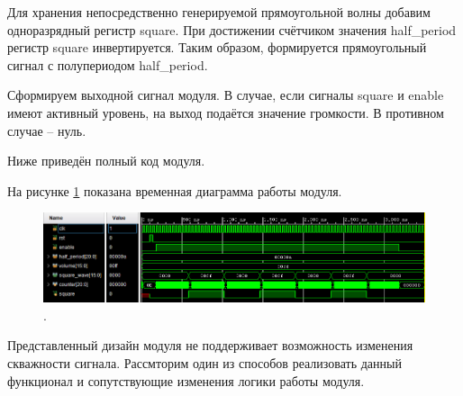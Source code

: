 \noindent
\begin{minipage}{\linewidth}
	
\end{minipage}

Для хранения непосредственно генерируемой прямоугольной волны добавим одноразрядный регистр square.
При достижении счётчиком значения half\_period регистр square инвертируется. Таким образом, формируется прямоугольный сигнал с полупериодом half\_period.

\noindent
\begin{minipage}{\linewidth}
	
\end{minipage}

Сформируем выходной сигнал модуля. В случае, если сигналы square и enable имеют активный уровень, на выход подаётся значение громкости. В противном случае -- нуль.

\noindent
\begin{minipage}{\linewidth}
	
\end{minipage}

Ниже приведён полный код модуля.

\noindent
\begin{minipage}{\linewidth}
	
\end{minipage}


На рисунке \ref{lab7:pic5} показана временная диаграмма работы модуля.

\begin{figure}[H]
	\centering
	\includegraphics [width=1\textwidth] {images/lab_7/square_simulate.PNG}
	\caption{.}
	\label{lab7:pic5}
\end{figure}


Представленный дизайн модуля не поддерживает возможность изменения скважности сигнала. Рассмторим один из способов реализовать данный функционал и сопутствующие изменения логики работы модуля.

